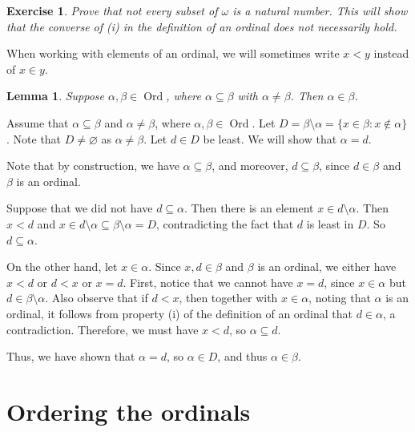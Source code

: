 \documentclass[10pt]{article}
\makeatletter
\DeclareMathOperator{\Ord}{Ord}
\theoremstyle{newstyle}
\newtheorem{lemma}[thm]{Lemma}
\newtheorem{exercise}[thm]{Exercise}
\newenvironment{pf}[1][\proofname]{\par
  \pushQED{\qed}%
  \normalfont \topsep0\p@\relax
  \trivlist
  \item[\hskip\labelsep\scshape
  #1\@addpunct{.}]\ignorespaces
}{%
  \popQED\endtrivlist\@endpefalse
}
\makeatother
\begin{document}
\begin{exercise}
Prove that not every subset of $\omega$ is a natural number. This will show that the 
converse of (i) in the definition of an ordinal does not necessarily hold. 
\end{exercise}

When working with elements of an ordinal, we will sometimes write $x < y$ instead of $x \in y$. 

\begin{lemma}
Suppose $\alpha, \beta \in \Ord$, where $\alpha \subseteq \beta$ with $\alpha \neq \beta$. 
Then $\alpha \in \beta$. 
\end{lemma}
\begin{pf}
Assume that $\alpha \subseteq \beta$ and $\alpha \neq \beta$, where $\alpha, \beta \in \Ord$. 
Let $D = \beta \setminus \alpha = \{x \in \beta : x \notin \alpha\}$. Note that 
$D \neq \varnothing$ as $\alpha \neq \beta$. Let $d \in D$ be least. We will show that $\alpha = d$. 

Note that by construction, we have $\alpha \subseteq \beta$, and moreover, $d \subseteq \beta$, 
since $d \in \beta$ and $\beta$ is an ordinal. 

Suppose that we did not have $d \subseteq \alpha$. Then there is an element $x \in d \setminus \alpha$. 
Then $x < d$ and $x \in d \setminus \alpha \subseteq \beta \setminus \alpha = D$, contradicting the 
fact that $d$ is least in $D$. So $d \subseteq \alpha$. 

On the other hand, let $x \in \alpha$. Since $x, d \in \beta$ and $\beta$ is an ordinal, 
we either have $x < d$ or $d < x$ or $x = d$. First, notice that we cannot have $x = d$, 
since $x \in \alpha$ but $d \in \beta \setminus \alpha$. Also observe that if 
$d < x$, then together with $x \in \alpha$, noting that $\alpha$ is an ordinal, 
it follows from property (i) of the definition of an ordinal that 
$d \in \alpha$, a contradiction. Therefore, we must have $x < d$, so $\alpha \subseteq d$. 

Thus, we have shown that $\alpha = d$, so $\alpha \in D$, and thus $\alpha \in \beta$.
\end{pf}

%  
\newpage\section{Ordering the ordinals} 
\end{document}
